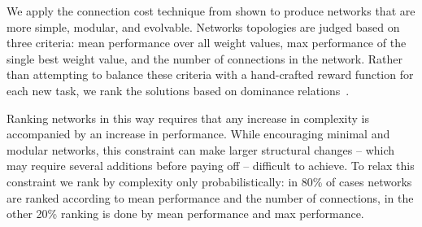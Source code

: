 We apply the connection cost technique from \cite{clune2013evolutionary} shown to produce networks that are more simple, modular, and evolvable.
%
Networks topologies are judged based on three criteria: mean performance over all weight values, max performance of the single best weight value, and the number of connections in the network. 
%
Rather than attempting to balance these criteria with a hand-crafted reward function for each new task, we rank the solutions based on dominance relations~\cite{nsga2}.
%


Ranking networks in this way requires that any increase in complexity is accompanied by an increase in performance.
%
While encouraging minimal and modular networks, this constraint can make larger structural changes -- which may require several additions before paying off -- difficult to achieve. 
%
%
To relax this constraint we rank by complexity only probabilistically: in 80\% of cases networks are ranked according to mean performance and the number of connections, in the other 20\% ranking is done by mean performance and max performance.



%
%

